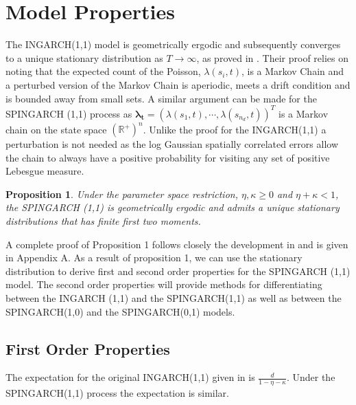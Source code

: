 \documentclass[11pt]{isuthesis}
\newtheorem{prop}{Proposition}
\begin{document}
\section{Model Properties}

The INGARCH(1,1) model is geometrically ergodic and subsequently converges to a unique stationary distribution as $T \to \infty$, as proved in \cite{fokianos2009poisson}.  Their proof relies on noting that the expected count of the Poisson, $\lambda(s_i,t)$, is a Markov Chain and a perturbed version of the Markov Chain is aperiodic, meets a drift condition and is bounded away from small sets.  A similar argument can be made for the SPINGARCH (1,1) process as $\boldsymbol{\lambda_t}=\left(\lambda(s_1,t),\cdots,\lambda(s_{n_d},t)\right)^T$ is a Markov chain on the state space $(\mathbb{R}^+)^n$. Unlike the proof for the INGARCH(1,1) a perturbation is not needed as the log Gaussian spatially correlated errors allow the chain to always have a positive probability for visiting any set of positive Lebesgue measure. 

\begin{prop} \label{Prop 1}
	Under the parameter space restriction, $\eta,\kappa\geq0$ and $\eta+\kappa<1$, the SPINGARCH (1,1) is geometrically ergodic and admits a unique stationary distributions that has finite first two moments.
\end{prop}
A complete proof of Proposition 1 follows closely the development in \cite{fokianos2009poisson} and is given in Appendix A.  As a result of proposition 1, we can use the stationary distribution to derive first and second order properties for the SPINGARCH (1,1) model.  The second order properties will provide methods for differentiating between the INGARCH (1,1) and the SPINGARCH(1,1) as well as between the SPINGARCH(1,0) and the SPINGARCH(0,1) models. 

\subsection{First Order Properties}

The expectation for the original INGARCH(1,1) given in \cite{ferland2006integer} is $\frac{d}{1-\eta-\kappa}$.  Under the SPINGARCH(1,1) process the expectation is similar.
\end{document}
